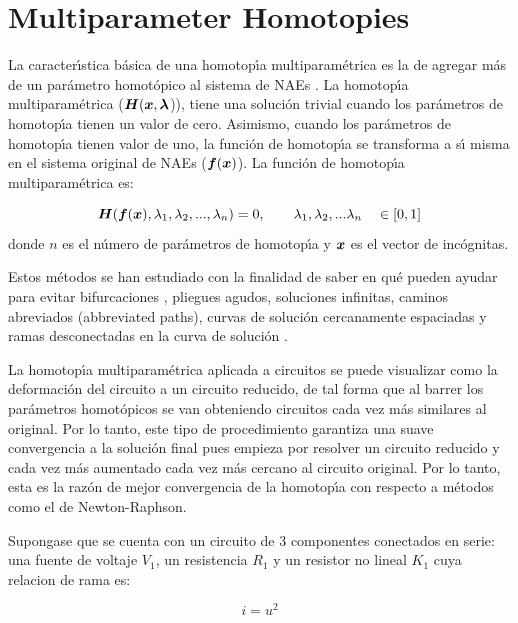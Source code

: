 \documentclass[conference,letterpaper,onecolumn]{IEEEtran}
\newcommand{\pig}[1]{\mbox{\boldmath ${#1}$}	}
\begin{document}
\section{Multiparameter Homotopies}


La caracter\'{\i}stica b\'asica de una homotop\'{\i}a multiparam\'etrica
es la de agregar m\'as de un par\'ametro homot\'opico al sistema de NAEs \cite{homo_DWolfMulti}.
La homotop\'{\i}a multiparam\'etrica ($\pig{H}(\pig{x},\pig{\lambda}$)),
tiene una soluci\'on trivial cuando los par\'ametros de
homotop\'{\i}a tienen un valor de cero. Asimismo, cuando 
los par\'ametros de homotop\'{\i}a
tienen valor de uno, la funci\'on de homotop\'{\i}a se 
transforma a s\'{\i} misma en el sistema original de NAEs
($\pig{f}(\pig{x})$). La funci\'on de homotop\'{\i}a
multiparam\'etrica es:

\begin{equation}
\pig{H}(\pig{f}(\pig{x}),\lambda_1,\lambda_2,...,\lambda_n)=0, \qquad
\lambda_1,\lambda_2,...\lambda_n\quad \in[0,1]
\end{equation}
donde $n$ es el n\'umero de par\'ametros de homotop\'{\i}a 
y  $\pig{x}$ es el vector de inc\'ognitas.


Estos m\'etodos se han estudiado con la finalidad
de saber en qu\'e pueden ayudar para evitar bifurcaciones \cite{homo_DWolfMulti},
pliegues agudos, soluciones infinitas,
caminos abreviados (abbreviated paths), curvas
de soluci\'on cercanamente espaciadas y ramas
desconectadas en la curva de soluci\'on \cite{homo_DWolfMulti}.

La homotop\'{\i}a multiparam\'etrica aplicada a circuitos se puede visualizar como la
deformaci\'on del circuito a un circuito reducido, de tal forma que al barrer
los par\'a\-me\-tros homot\'opicos se van obteniendo circuitos cada vez m\'as similares
al original. Por lo tanto, este tipo de procedimiento garantiza una suave convergencia
a la soluci\'on final pues empieza por resolver un circuito reducido y cada vez m\'as aumentado cada vez m\'as cercano al circuito original. Por lo tanto, esta es la raz\'on de mejor convergencia
de la homotop\'{\i}a con respecto a m\'etodos como el de Newton-Raphson.

Supongase que se cuenta con un circuito de 3 componentes conectados en serie: una fuente de voltaje $V_1$,
un resistencia $R_1$ y un resistor no lineal $K_1$ cuya relacion  de rama es:

\begin{displaymath}
i=u^2
\end{displaymath}
\end{document}
